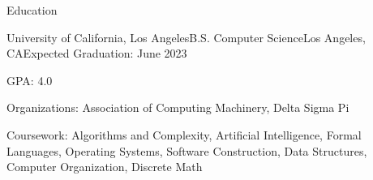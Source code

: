 \documentclass{article}
\newlength{\tabin}
\newlength{\secsep}
\newcommand{\lineunder}{\vspace*{-8pt} \\ \hspace*{-6pt} \hrulefill \\ \vspace*{-15pt}}
\newenvironment{tabbedsection}[1]{
  \begin{list}{}{
      \setlength{\itemsep}{0pt}
      \setlength{\labelsep}{0pt}
      \setlength{\labelwidth}{0pt}
      \setlength{\leftmargin}{\tabin}
      \setlength{\rightmargin}{\tabin}
      \setlength{\listparindent}{0pt}
      \setlength{\parsep}{0pt}
      \setlength{\parskip}{0pt}
      \setlength{\partopsep}{0pt}
      \setlength{\topsep}{#1}
    }
  \item[]
}{\end{list}}
\newenvironment{resume_section}[1]{
  \filbreak
  \vspace{2\secsep}
  \textsc{\large#1}
  \lineunder
  \begin{tabbedsection}{\secsep}
}{\end{tabbedsection}}
\newenvironment{subitems}{
  \renewcommand{\labelitemi}{-}
  \begin{itemize}
      \setlength{\labelsep}{1em}
}{\end{itemize}}
\newenvironment{resume_employer}[4]{
  \vspace{\secsep}
  \textbf{#1} \hfill{\footnotesize#3} \\
  \indent {\small #2} \hfill{\footnotesize(#4)} \par
  \begin{tabbedsection}{0pt}
  \begin{subitems}
}{\end{subitems}\end{tabbedsection}}
\begin{document}
\begin{resume_section}{Education }
  \begin{resume_employer}{University of California, Los Angeles}{B.S. Computer Science}{Los Angeles, CA}{Expected Graduation: June 2023}
      \item GPA: 4.0
      \item Organizations:  Association of Computing Machinery, Delta Sigma Pi
      \item Coursework: Algorithms and Complexity, Artificial Intelligence, Formal Languages, Operating Systems, Software Construction, Data Structures, Computer Organization, Discrete Math
  \end{resume_employer}
\end{resume_section}
\end{document}
